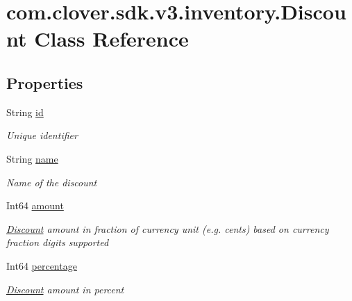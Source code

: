 \hypertarget{classcom_1_1clover_1_1sdk_1_1v3_1_1inventory_1_1_discount}{}\section{com.\+clover.\+sdk.\+v3.\+inventory.\+Discount Class Reference}
\label{classcom_1_1clover_1_1sdk_1_1v3_1_1inventory_1_1_discount}
\subsection*{Properties}
\begin{DoxyCompactItemize}
\item 
String \hyperlink{classcom_1_1clover_1_1sdk_1_1v3_1_1inventory_1_1_discount_a1c78c2f4d90c1ab551663921af19af1e}{id}
\begin{DoxyCompactList}\small\item\em Unique identifier \end{DoxyCompactList}\item 
String \hyperlink{classcom_1_1clover_1_1sdk_1_1v3_1_1inventory_1_1_discount_abd67ee6bdce03523e0c1a329db48ab6a}{name}
\begin{DoxyCompactList}\small\item\em Name of the discount \end{DoxyCompactList}\item 
Int64 \hyperlink{classcom_1_1clover_1_1sdk_1_1v3_1_1inventory_1_1_discount_a4768fbc2bfbcc71d4c7e27e23b1da2dd}{amount}
\begin{DoxyCompactList}\small\item\em \hyperlink{classcom_1_1clover_1_1sdk_1_1v3_1_1inventory_1_1_discount}{Discount} amount in fraction of currency unit (e.\+g. cents) based on currency fraction digits supported \end{DoxyCompactList}\item 
Int64 \hyperlink{classcom_1_1clover_1_1sdk_1_1v3_1_1inventory_1_1_discount_aa3da776e68604e2725f96b48e4fcfdad}{percentage}
\begin{DoxyCompactList}\small\item\em \hyperlink{classcom_1_1clover_1_1sdk_1_1v3_1_1inventory_1_1_discount}{Discount} amount in percent \end{DoxyCompactList}\end{DoxyCompactItemize}


